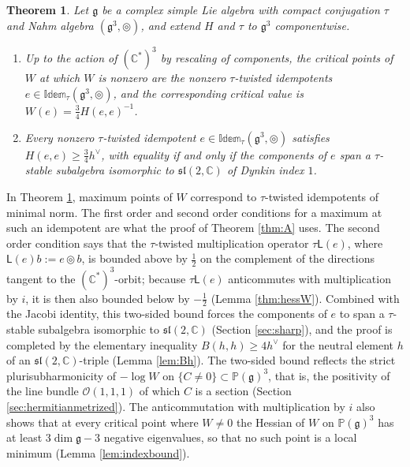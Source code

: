 \documentclass[leqno,10pt]{amsart}
\newtheorem{theorem}{Theorem}[section]
\theoremstyle{definition}
\numberwithin{equation}{section}
\newcommand{\idem}{\mathbb{Idem}}
\newcommand{\tmlt}{\circledcirc}
\newcommand{\lin}{\mathsf{L}}
\newcommand{\sll}{\mathfrak{sl}}
\newcommand{\proj}{\mathbb{P}}
\newcommand{\g}{\mathfrak{g}}
\newcommand{\com}{\mathbb C}
\newcommand{\hv}{h^\vee}
\begin{document}
\begin{theorem}\label{thm:C}
Let $\g$ be a complex simple Lie algebra with compact conjugation $\tau$ and Nahm algebra $(\g^{3}, \tmlt)$, and extend $H$ and $\tau$ to $\g^{3}$ componentwise.
\begin{enumerate}[label=(\arabic*), ref=(\arabic*)]
\item\label{thmC1} Up to the action of $(\com^{\ast})^{3}$ by rescaling of components, the critical points of $W$ at which $W$ is nonzero are the nonzero $\tau$-twisted idempotents $e \in \idem_{\tau}(\g^{3}, \tmlt)$, and the corresponding critical value is $W(e) = \tfrac{3}{4}H(e, e)^{-1}$.
\item\label{thmC2} Every nonzero $\tau$-twisted idempotent $e \in \idem_{\tau}(\g^{3}, \tmlt)$ satisfies $H(e, e) \geq \tfrac{3}{4}\hv$, with equality if and only if the components of $e$ span a $\tau$-stable subalgebra isomorphic to $\sll(2, \com)$ of Dynkin index $1$.
\end{enumerate}
\end{theorem}

In Theorem \ref{thm:C}, maximum points of $W$ correspond to $\tau$-twisted idempotents of minimal norm. The first order and second order conditions for a maximum at such an idempotent are what the proof of Theorem \ref{thm:A} uses. The second order condition says that the $\tau$-twisted multiplication operator $\tau\lin(e)$, where $\lin(e)b := e \tmlt b$, is bounded above by $\tfrac{1}{2}$ on the complement of the directions tangent to the $(\com^{\ast})^{3}$-orbit; because $\tau\lin(e)$ anticommutes with multiplication by $i$, it is then also bounded below by $-\tfrac{1}{2}$ (Lemma \ref{thm:hessW}). Combined with the Jacobi identity, this two-sided bound forces the components of $e$ to span a $\tau$-stable subalgebra isomorphic to $\sll(2, \com)$ (Section \ref{sec:sharp}), and the proof is completed by the elementary inequality $B(h, h) \geq 4\hv$ for the neutral element $h$ of an $\sll(2, \com)$-triple (Lemma \ref{lem:Bh}). The two-sided bound reflects the strict plurisubharmonicity of $-\log W$ on $\{C \neq 0\} \subset \proj(\g)^{3}$, that is, the positivity of the line bundle $\mathcal{O}(1, 1, 1)$ of which $C$ is a section (Section \ref{sec:hermitianmetrized}). The anticommutation with multiplication by $i$ also shows that at every critical point where $W \neq 0$ the Hessian of $W$ on $\proj(\g)^{3}$ has at least $3\dim\g - 3$ negative eigenvalues, so that no such point is a local minimum (Lemma \ref{lem:indexbound}).
\end{document}
